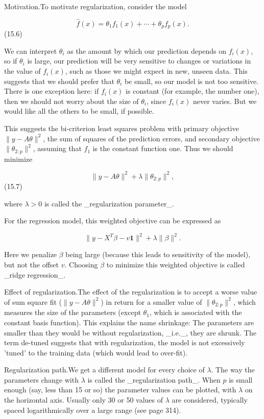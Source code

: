
Motivation.To motivate regularization, consider the model

\[\hat{f}(x)=\theta_{1}f_{1}(x)+\cdots+\theta_{p}f_{p}(x).\] (15.6)

We can interpret \(\theta_{i}\) as the amount by which our prediction depends on \(f_{i}(x)\), so if \(\theta_{i}\) is large, our prediction will be very sensitive to changes or variations in the value of \(f_{i}(x)\), such as those we might expect in new, unseen data. This suggests that we should prefer that \(\theta_{i}\) be small, so our model is not too sensitive. There is one exception here: if \(f_{i}(x)\) is constant (for example, the number one), then we should not worry about the size of \(\theta_{i}\), since \(f_{i}(x)\) never varies. But we would like all the others to be small, if possible.

This suggests the bi-criterion least squares problem with primary objective \(\|y-A\theta\|^{2}\), the sum of squares of the prediction errors, and secondary objective \(\|\theta_{2:p}\|^{2}\), assuming that \(f_{1}\) is the constant function one. Thus we should minimize

\[\|y-A\theta\|^{2}+\lambda\|\theta_{2:p}\|^{2},\] (15.7)

where \(\lambda>0\) is called the _regularization parameter_.

For the regression model, this weighted objective can be expressed as

\[\|y-X^{T}\beta-v\mathbf{1}\|^{2}+\lambda\|\beta\|^{2}.\]

Here we penalize \(\beta\) being large (because this leads to sensitivity of the model), but not the offset \(v\). Choosing \(\beta\) to minimize this weighted objective is called _ridge regression_.

Effect of regularization.The effect of the regularization is to accept a worse value of sum square fit (\(\|y-A\theta\|^{2}\)) in return for a smaller value of \(\|\theta_{2:p}\|^{2}\), which measures the size of the parameters (except \(\theta_{1}\), which is associated with the constant basis function). This explains the name shrinkage: The parameters are smaller than they would be without regularization, _i.e._, they are shrunk. The term de-tuned suggests that with regularization, the model is not excessively 'tuned' to the training data (which would lead to over-fit).

Regularization path.We get a different model for every choice of \(\lambda\). The way the parameters change with \(\lambda\) is called the _regularization path_. When \(p\) is small enough (say, less than 15 or so) the parameter values can be plotted, with \(\lambda\) on the horizontal axis. Usually only 30 or 50 values of \(\lambda\) are considered, typically spaced logarithmically over a large range (see page 314).

